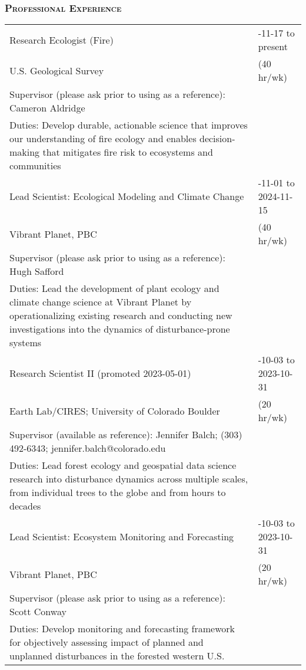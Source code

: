 \documentclass[10pt,english]{article}
\providecommand{\tabularnewline}{\\}
\begin{document}

\subsubsection*{\textsc{Professional Experience}}
\vspace{-0.5ex}

\renewcommand{\arraystretch}{1.2}
\begin{tabularx}{\textwidth}{@{}>{\raggedright}p{4.5in} >{\raggedleft}X@{}}

Research Ecologist (Fire) & 2024-11-17 to present \tabularnewline
\addtolength{\leftskip}{5ex}U.S. Geological Survey & (40 hr/wk) \tabularnewline
\addtolength{\leftskip}{5ex}Supervisor (please ask prior to using as a reference): Cameron Aldridge & \tabularnewline
\addtolength{\leftskip}{5ex}Duties: Develop durable, actionable science that improves our understanding of fire ecology and enables decision-making that mitigates fire risk to ecosystems and communities & \tabularnewline

Lead Scientist: Ecological Modeling and Climate Change & 2023-11-01 to 2024-11-15 \tabularnewline
\addtolength{\leftskip}{5ex}Vibrant Planet, PBC & (40 hr/wk) \tabularnewline
\addtolength{\leftskip}{5ex}Supervisor (please ask prior to using as a reference): Hugh Safford & \tabularnewline
\addtolength{\leftskip}{5ex}Duties: Lead the development of plant ecology and climate change science at Vibrant Planet by operationalizing existing research and conducting new investigations into the dynamics of disturbance-prone systems & \tabularnewline

Research Scientist II (promoted 2023-05-01) & 2022-10-03 to 2023-10-31 \tabularnewline
\addtolength{\leftskip}{5ex}Earth Lab/CIRES; University of Colorado Boulder & (20 hr/wk) \tabularnewline
\addtolength{\leftskip}{5ex}Supervisor (available as reference): Jennifer Balch; (303) 492-6343; jennifer.balch@colorado.edu & \tabularnewline
\addtolength{\leftskip}{5ex}Duties: Lead forest ecology and geospatial data science research into disturbance dynamics across multiple scales, from individual trees to the globe and from hours to decades  & \tabularnewline

Lead Scientist: Ecosystem Monitoring and Forecasting & 2022-10-03 to 2023-10-31 \tabularnewline
\addtolength{\leftskip}{5ex}Vibrant Planet, PBC & (20 hr/wk) \tabularnewline
\addtolength{\leftskip}{5ex}Supervisor (please ask prior to using as a reference): Scott Conway & \tabularnewline
\addtolength{\leftskip}{5ex}Duties: Develop monitoring and forecasting framework for objectively assessing impact of planned and unplanned disturbances in the forested western U.S. & \tabularnewline


\end{tabularx}
\end{document}
